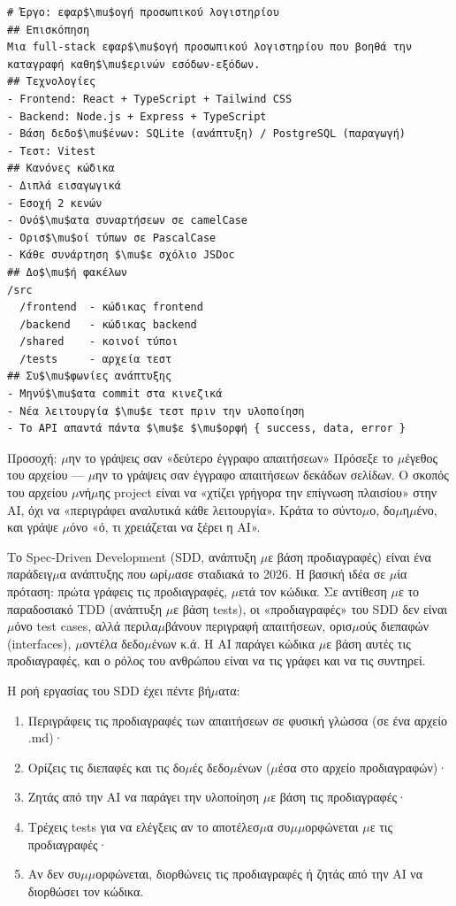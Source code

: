 \begin{lstlisting}
# Έργο: εφαρ$\mu$ογή προσωπικού λογιστηρίου
## Επισκόπηση
Μια full-stack εφαρ$\mu$ογή προσωπικού λογιστηρίου που βοηθά την καταγραφή καθη$\mu$ερινών εσόδων-εξόδων.
## Τεχνολογίες
- Frontend: React + TypeScript + Tailwind CSS
- Backend: Node.js + Express + TypeScript
- Βάση δεδο$\mu$ένων: SQLite (ανάπτυξη) / PostgreSQL (παραγωγή)
- Τεστ: Vitest
## Κανόνες κώδικα
- Διπλά εισαγωγικά
- Εσοχή 2 κενών
- Ονό$\mu$ατα συναρτήσεων σε camelCase
- Ορισ$\mu$οί τύπων σε PascalCase
- Κάθε συνάρτηση $\mu$ε σχόλιο JSDoc
## Δο$\mu$ή φακέλων
/src
  /frontend  - κώδικας frontend
  /backend   - κώδικας backend
  /shared    - κοινοί τύποι
  /tests     - αρχεία τεστ
## Συ$\mu$φωνίες ανάπτυξης
- Μηνύ$\mu$ατα commit στα κινεζικά
- Νέα λειτουργία $\mu$ε τεστ πριν την υλοποίηση
- Το API απαντά πάντα $\mu$ε $\mu$ορφή { success, data, error }
\end{lstlisting}

\begin{tcbwarn}{Προσοχή: $\mu$ην το γράψεις σαν «δεύτερο έγγραφο απαιτήσεων»}
Πρόσεξε το $\mu$έγεθος του αρχείου — $\mu$ην το γράψεις σαν έγγραφο απαιτήσεων δεκάδων σελίδων. Ο σκοπός του αρχείου $\mu$νή$\mu$ης project είναι να «χτίζει γρήγορα την επίγνωση πλαισίου» στην AI, όχι να «περιγράφει αναλυτικά κάθε λειτουργία». Κράτα το σύντο$\mu$ο, δο$\mu$η$\mu$ένο, και γράψε $\mu$όνο «ό, τι χρειάζεται να ξέρει η AI».

\end{tcbwarn}


Το Spec-Driven Development (SDD, ανάπτυξη $\mu$ε βάση προδιαγραφές) είναι ένα παράδειγ$\mu$α ανάπτυξης που ωρί$\mu$ασε σταδιακά το 2026. Η βασική ιδέα σε $\mu$ία πρόταση: πρώτα γράφεις τις προδιαγραφές, $\mu$ετά τον κώδικα. Σε αντίθεση $\mu$ε το παραδοσιακό TDD (ανάπτυξη $\mu$ε βάση tests), οι «προδιαγραφές» του SDD δεν είναι $\mu$όνο test cases, αλλά περιλα$\mu$βάνουν περιγραφή απαιτήσεων, ορισ$\mu$ούς διεπαφών (interfaces), $\mu$οντέλα δεδο$\mu$ένων κ.ά. Η AI παράγει κώδικα $\mu$ε βάση αυτές τις προδιαγραφές, και ο ρόλος του ανθρώπου είναι να τις γράφει και να τις συντηρεί.

Η ροή εργασίας του SDD έχει πέντε βή$\mu$ατα:

\begin{enumerate}
  \item Περιγράφεις τις προδιαγραφές των απαιτήσεων σε φυσική γλώσσα (σε ένα αρχείο .md)·
  \item Ορίζεις τις διεπαφές και τις δο$\mu$ές δεδο$\mu$ένων ($\mu$έσα στο αρχείο προδιαγραφών)·
  \item Ζητάς από την AI να παράγει την υλοποίηση $\mu$ε βάση τις προδιαγραφές·
  \item Τρέχεις tests για να ελέγξεις αν το αποτέλεσ$\mu$α συ$\mu$$\mu$ορφώνεται $\mu$ε τις προδιαγραφές·
  \item Αν δεν συ$\mu$$\mu$ορφώνεται, διορθώνεις τις προδιαγραφές ή ζητάς από την AI να διορθώσει τον κώδικα.
\end{enumerate}

